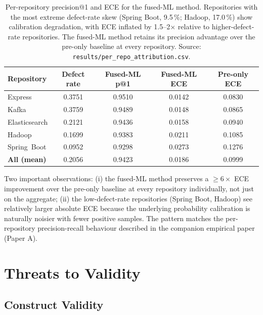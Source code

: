 \documentclass[11pt,a4paper]{article}
\begin{document}
\begin{table}[!ht]
\centering
\caption{Per-repository precision@1 and ECE for the fused-ML method.
Repositories with the most extreme defect-rate skew (Spring Boot,
9.5\,\%; Hadoop, 17.0\,\%) show calibration degradation, with ECE
inflated by 1.5--2$\times$ relative to higher-defect-rate
repositories. The fused-ML method retains its precision advantage
over the pre-only baseline at every repository.
Source: \texttt{results/per\_repo\_attribution.csv}.}
\label{tab:per_repo_attr}
\small
\begin{tabular}{lcccc}
\toprule
Repository          & Defect rate & Fused-ML p@1 & Fused-ML ECE & Pre-only ECE \\
\midrule
Express             & 0.3751 & 0.9510 & 0.0142 & 0.0830 \\
Kafka               & 0.3759 & 0.9489 & 0.0148 & 0.0865 \\
Elasticsearch       & 0.2121 & 0.9436 & 0.0158 & 0.0940 \\
Hadoop              & 0.1699 & 0.9383 & 0.0211 & 0.1085 \\
Spring~Boot         & 0.0952 & 0.9298 & 0.0273 & 0.1276 \\
\midrule
\textbf{All (mean)} & 0.2056 & 0.9423 & 0.0186 & 0.0999 \\
\bottomrule
\end{tabular}
\end{table}

Two important observations: (i) the fused-ML method preserves a
$\geq 6\times$ ECE improvement over the pre-only baseline at every
repository individually, not just on the aggregate; (ii) the
low-defect-rate repositories (Spring Boot, Hadoop) see relatively
larger absolute ECE because the underlying probability calibration
is naturally noisier with fewer positive samples. The pattern
matches the per-repository precision-recall behaviour described in
the companion empirical paper (Paper A).

\section{Threats to Validity}
\label{sec:threats}
\FloatBarrier

\subsection{Construct Validity}
\end{document}
